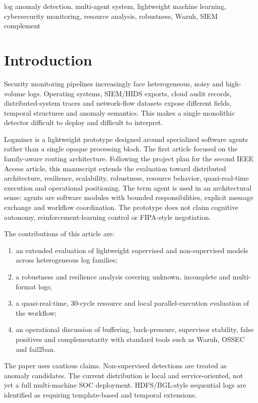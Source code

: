 \documentclass[journal]{IEEEtran}
\newcommand{\logminer}{Logminer}
\begin{document}
\begin{IEEEkeywords}
log anomaly detection, multi-agent system, lightweight machine learning, cybersecurity monitoring, resource analysis, robustness, Wazuh, SIEM complement
\end{IEEEkeywords}

\section{Introduction}
Security monitoring pipelines increasingly face heterogeneous, noisy and high-volume logs. Operating systems, SIEM/HIDS exports, cloud audit records, distributed-system traces and network-flow datasets expose different fields, temporal structures and anomaly semantics. This makes a single monolithic detector difficult to deploy and difficult to interpret.

\logminer{} is a lightweight prototype designed around specialized software agents rather than a single opaque processing block. The first article focused on the family-aware routing architecture. Following the project plan for the second IEEE Access article, this manuscript extends the evaluation toward distributed architecture, resilience, scalability, robustness, resource behavior, quasi-real-time execution and operational positioning. The term agent is used in an architectural sense: agents are software modules with bounded responsibilities, explicit message exchange and workflow coordination. The prototype does not claim cognitive autonomy, reinforcement-learning control or FIPA-style negotiation.

The contributions of this article are:
\begin{enumerate}
    \item an extended evaluation of lightweight supervised and non-supervised models across heterogeneous log families;
    \item a robustness and resilience analysis covering unknown, incomplete and multi-format logs;
    \item a quasi-real-time, 30-cycle resource and local parallel-execution evaluation of the workflow;
    \item an operational discussion of buffering, back-pressure, supervisor stability, false positives and complementarity with standard tools such as Wazuh, OSSEC and fail2ban.
\end{enumerate}

The paper uses cautious claims. Non-supervised detections are treated as anomaly candidates. The current distribution is local and service-oriented, not yet a full multi-machine SOC deployment. HDFS/BGL-style sequential logs are identified as requiring template-based and temporal extensions.
\end{document}
